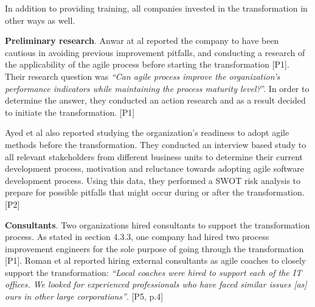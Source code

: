 In addition to providing training, all companies invested in the
transformation in other ways as well.

{\bfseries Preliminary research}. Anwar at al reported the company
to have been cautious in avoiding previous improvement pitfalls,
and conducting a research of the applicability of the agile process
before starting the transformation [P1]. Their research question was
\textit{``Can agile process improve the organization's performance
indicators while maintaining the process maturity level?}''. In order to
determine the answer, they conducted an action research and as a result
decided to initiate the transformation. [P1]

Ayed et al also reported studying the organization's readiness to adopt
agile methods before the transformation. They conducted an interview
based study to all relevant stakeholders from different business
units to determine their current development process, motivation and
reluctance towards adopting agile software development process. Using
this data, they performed a SWOT risk analysis to prepare for possible
pitfalls that might occur during or after the transformation. [P2]

{\bfseries Consultants}. Two organizations hired consultants to support
the transformation process. As stated in section 4.3.3, one company had
hired two process improvement engineers for the sole purpose of going
through the transformation [P1]. Roman et al reported hiring external
consultants as agile coaches to closely support the transformation:
\textit{``Local coaches were hired to support each of the IT offices. We
looked for experienced professionals who have faced similar issues [as]
ours in other large corporations''}. [P5, p.4]
